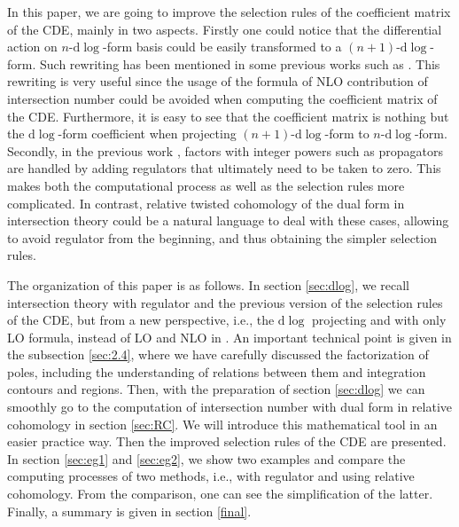 \documentclass[a4paper,11pt]{article}
\newcommand{\nd}{\mathrm{d}}
\begin{document}
In this paper, we are going to improve the selection rules of the coefficient matrix of the CDE, mainly in two aspects. Firstly one could notice that the differential action on $n$-$\nd \log$-form basis could be easily transformed to a $(n+1)$-$\nd \log$-form.  Such rewriting has been mentioned in some previous works such as \cite{De:2023xue}.
This rewriting is very useful since the usage of the formula of  NLO contribution of intersection number could be avoided when computing the coefficient matrix of the CDE. Furthermore, it is easy to see that the coefficient matrix is nothing but the $\nd \log$-form coefficient when projecting $(n+1)$-$\nd \log$-form to $n$-$\nd \log$-form.  Secondly, in the previous work \cite{Chen:2023kgw}, factors with integer powers such as propagators are handled by adding regulators that ultimately need to be taken to zero. This makes both the computational process as well as the selection rules more complicated. In contrast, relative twisted cohomology of the dual form \cite{Caron-Huot:2021xqj, Caron-Huot:2021iev, Giroux:2022wav, De:2023xue} in intersection theory could be a natural language to deal with these cases, allowing to avoid regulator from the beginning, and thus obtaining the simpler selection rules. 



The organization of this paper is as follows. In section \ref{sec:dlog}, we recall intersection theory with regulator and the previous version of the selection rules of the CDE, but from a new perspective, i.e., the $\nd \log$ projecting and with only LO formula, instead of LO and NLO in \cite{Chen:2023kgw}. An important technical point is given in the subsection \ref{sec:2.4}, where we have carefully discussed the factorization of poles, including the understanding of relations between them and integration contours and regions. Then, with the preparation of section \ref{sec:dlog} we can smoothly go to the computation of intersection number with dual form in relative cohomology in section \ref{sec:RC}. We will introduce this mathematical tool in an easier practice way. Then the improved selection rules of the CDE are presented. In section \ref{sec:eg1} and \ref{sec:eg2}, we show two examples and compare the computing processes of two methods, i.e., with regulator and using relative cohomology. From the comparison, one can see the simplification of the latter. Finally, a summary is given in section \ref{final}.






\end{document}
